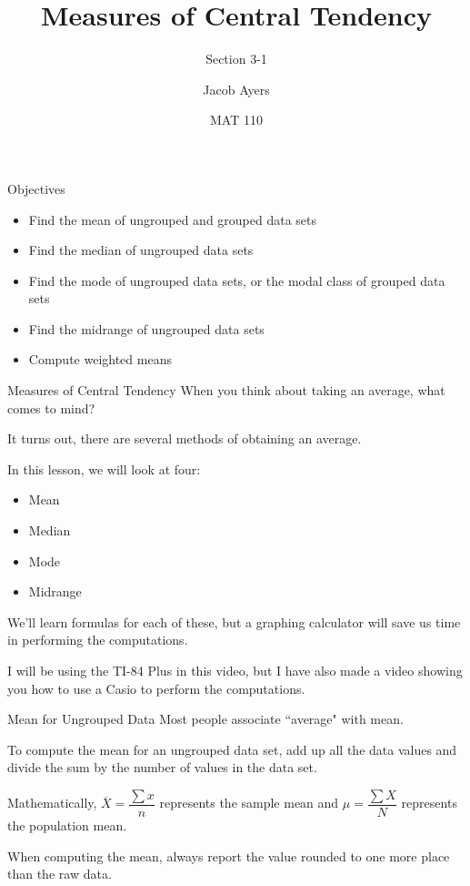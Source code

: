 \documentclass[t, aspectratio=169]{beamer}
\title[3-1]{Measures of Central Tendency}
\subtitle{Section 3-1}
\author{Jacob Ayers}
\institute{Lesson \#5}
\date{MAT 110}
\newcommand{\?}{\stackrel{?}{=}}
\begin{document}
	
	\begin{frame}
		\titlepage
	\end{frame}
	
	\begin{frame}{Objectives}
		\begin{itemize}
			\item Find the mean of ungrouped and grouped data sets
			\item Find the median of ungrouped data sets
			\item Find the mode of ungrouped data sets, or the modal class of grouped data sets
			\item Find the midrange of ungrouped data sets
			\item Compute weighted means
		\end{itemize}
	\end{frame}

	\begin{frame}{Measures of Central Tendency}
		When you think about taking an average, what comes to mind? \pause
		
		It turns out, there are several methods of obtaining an average. \pause
		
		In this lesson, we will look at four: \begin{itemize}
			\item Mean
			\item Median
			\item Mode
			\item Midrange
		\end{itemize}
	
		We'll learn formulas for each of these, but a graphing calculator will save us time in performing the computations. \pause
		
		I will be using the TI-84 Plus in this video, but I have also made a video showing you how to use a Casio to perform the computations.
	\end{frame}

	\begin{frame}{Mean for Ungrouped Data}
		Most people associate ``average" with mean. \pause
		
		To compute the mean for an ungrouped data set, add up all the data values and divide the sum by the number of values in the data set. \pause
		
		Mathematically, $\overline{X} = \dfrac{\sum x}{n}$ represents the sample mean and $\mu = \dfrac{\sum X}{N}$ represents the population mean. \pause
		
		When computing the mean, always report the value rounded to one more place than the raw data.
	\end{frame}
\end{document}
